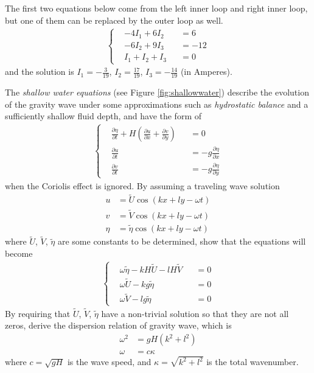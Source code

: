 \begin{Answer}
The first two equations below come from the left inner loop and right inner loop, but one of them can be replaced by the outer loop as well.
\begin{align*}
\left\{
\begin{alignedat}{2}
&-4I_1 + 6I_2& &= 6\\
&-6I_2 + 9I_3& &= -12\\
&I_1 + I_2 + I_3& &= 0
\end{alignedat}\right.
\end{align*}
and the solution is $I_1 = -\frac{3}{19}$, $I_2 = \frac{17}{19}$, $I_3 = -\frac{14}{19}$ (in Amperes).
\end{Answer}

\begin{Exercise}
\label{ex:shallowwater}
The \textit{shallow water equations} (see Figure \ref{fig:shallowwater}) describe the evolution of the gravity wave under some approximations such as \textit{hydrostatic balance} and a sufficiently shallow fluid depth, and have the form of
\begin{align}
\left\{\begin{alignedat}{2}
&\frac{\partial \eta}{\partial t} + H(\frac{\partial u}{\partial x} + \frac{\partial v}{\partial y})& &= 0 \\
&\frac{\partial u}{\partial t}& &= -g\frac{\partial \eta}{\partial x} \\
&\frac{\partial v}{\partial t}& &= -g\frac{\partial \eta}{\partial y} 
\end{alignedat}\right.
\end{align}
when the Coriolis effect is ignored. By assuming a traveling wave solution
\begin{align*}
u &= \tilde{U} \cos(kx + ly - \omega t) \\
v &= \tilde{V} \cos(kx + ly - \omega t) \\
\eta &= \tilde{\eta} \cos(kx + ly - \omega t)
\end{align*}
where $\tilde{U}$, $\tilde{V}$, $\tilde{\eta}$ are some constants to be determined, show that the equations will become
\begin{align}
\left\{\begin{alignedat}{2}
&\omega \tilde{\eta} - kH \tilde{U} - lH \tilde{V}& &= 0 \\
&\omega \tilde{U} - kg \tilde{\eta}& &= 0 \\
&\omega \tilde{V} - lg \tilde{\eta}& &= 0
\end{alignedat}\right.
\end{align}
By requiring that $\tilde{U}$, $\tilde{V}$, $\tilde{\eta}$ have a non-trivial solution so that they are not all zeros, derive the dispersion relation of gravity wave, which is
\begin{align*}
\omega^2 &= gH(k^2 + l^2) \\
\omega &= c\kappa
\end{align*}
where $c = \sqrt{gH}$ is the wave speed, and $\kappa = \sqrt{k^2 + l^2}$ is the total wavenumber.
\end{Exercise}
